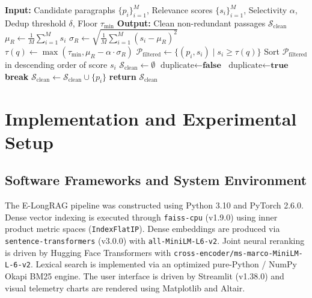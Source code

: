 \documentclass[lettersize,journal]{IEEEtran}
\begin{document}
\begin{algorithm}[H]
\caption{Query-Adaptive Context Filtering and Semantic Deduplication}\label{alg:adaptive_filter}
\begin{algorithmic}[1]
\STATE \textbf{Input:} Candidate paragraphs $\{p_i\}_{i=1}^M$, Relevance scores $\{s_i\}_{i=1}^M$, Selectivity $\alpha$, Dedup threshold $\delta$, Floor $\tau_{\min}$
\STATE \textbf{Output:} Clean non-redundant passages $\mathcal{S}_{\text{clean}}$
\STATE $\mu_R \gets \frac{1}{M} \sum_{i=1}^M s_i$
\STATE $\sigma_R \gets \sqrt{\frac{1}{M} \sum_{i=1}^M (s_i - \mu_R)^2}$
\STATE $\tau(q) \gets \max(\tau_{\min}, \mu_R - \alpha \cdot \sigma_R)$
\STATE $\mathcal{P}_{\text{filtered}} \gets \{ (p_i, s_i) \mid s_i \ge \tau(q) \}$
\STATE Sort $\mathcal{P}_{\text{filtered}}$ in descending order of score $s_i$
\STATE $\mathcal{S}_{\text{clean}} \gets \emptyset$
    \STATE $\text{duplicate} \gets \textbf{false}$
            \STATE $\text{duplicate} \gets \textbf{true}$
            \STATE \textbf{break}
        \ENDIF
    \ENDFOR
        \STATE $\mathcal{S}_{\text{clean}} \gets \mathcal{S}_{\text{clean}} \cup \{ p_i \}$
    \ENDIF
\ENDFOR
\STATE \textbf{return} $\mathcal{S}_{\text{clean}}$
\end{algorithmic}
\end{algorithm}

\section{Implementation and Experimental Setup}

\subsection{Software Frameworks and System Environment}
The E-LongRAG pipeline was constructed using Python 3.10 and PyTorch 2.6.0. Dense vector indexing is executed through \texttt{faiss-cpu} (v1.9.0) using inner product metric spaces (\texttt{IndexFlatIP}). Dense embeddings are produced via \texttt{sentence-transformers} (v3.0.0) with \texttt{all-MiniLM-L6-v2}. Joint neural reranking is driven by Hugging Face Transformers with \texttt{cross-encoder/ms-marco-MiniLM-L-6-v2}. Lexical search is implemented via an optimized pure-Python / NumPy Okapi BM25 engine. The user interface is driven by Streamlit (v1.38.0) and visual telemetry charts are rendered using Matplotlib and Altair.
\end{document}
